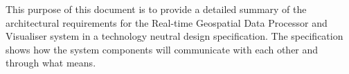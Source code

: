 This purpose of this document is to provide a detailed summary of the architectural requirements for the Real-time Geospatial Data Processor and Visualiser system in a technology neutral design specification. The specification shows how the system components will communicate with each other and through what means.